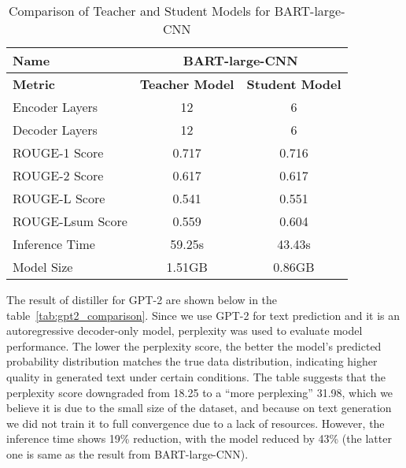 \begin{table}[h!]
    \centering
    \begin{tabular}{lcc}
        \toprule
        \textbf{Name}         & \multicolumn{2}{c}{\textbf{BART-large-CNN}} \\ \midrule
        \textbf{Metric}       & \textbf{Teacher Model} & \textbf{Student Model} \\ \midrule
        Encoder Layers        & 12                     & 6                     \\
        Decoder Layers        & 12                     & 6                     \\
        ROUGE-1 Score         & 0.717                  & 0.716                  \\
        ROUGE-2 Score         & 0.617                  & 0.617                  \\
        ROUGE-L Score         & 0.541                  & 0.551                  \\
        ROUGE-Lsum Score      & 0.559                  & 0.604                  \\
        Inference Time        & 59.25s                 & 43.43s                 \\
        Model Size            & 1.51GB                 & 0.86GB                 \\ \bottomrule
    \end{tabular}
    \caption{Comparison of Teacher and Student Models for BART-large-CNN}
    \label{tab:BART_comparison}
\end{table}

The result of distiller for GPT-2 are shown below in the table~\ref{tab:gpt2_comparison}. Since we use GPT-2 for text prediction and it is an autoregressive decoder-only model, perplexity was used to evaluate model performance. The lower the perplexity score, the better the model's predicted probability distribution matches the true data distribution, indicating higher quality in generated text under certain conditions. The table suggests that the perplexity score downgraded from 18.25 to a ``more perplexing'' 31.98, which we believe it is due to the small size of the dataset, and because on text generation we did not train it to full convergence due to a lack of resources. However, the inference time shows 19\% reduction, with the model reduced by 43\% (the latter one is same as the result from BART-large-CNN).

